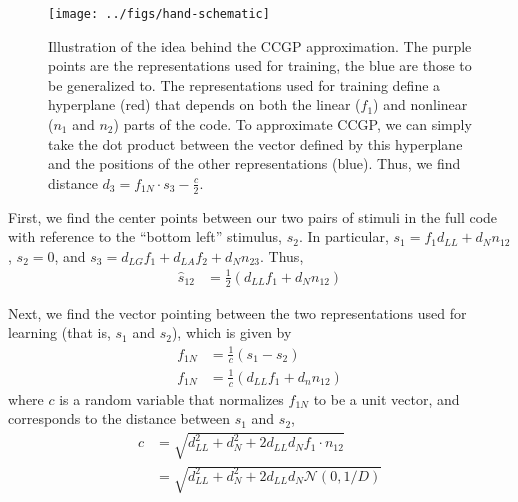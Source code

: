 \documentclass[letter,12pt]{article}
\newcommand{\dll}{d_{LL}}
\newcommand{\dlg}{d_{LG}}
\newcommand{\dla}{d_{LA}}
\newcommand{\dn}{d_{N}}
\newcommand{\dis}{\mathcal{N}(0, 1/D)}
\begin{document}
\begin{figure}[ht!]
  \begin{center}
    \texttt{[image: ../figs/hand-schematic]}
  \end{center}
  \caption[Illustration of the idea behind the CCGP approximation.]
          {Illustration of the idea behind the CCGP approximation.
            The purple points are the representations used for training, the
            blue are those to be generalized to. The representations used
            for training define a hyperplane (red) that depends on both the
            linear ($f_{1}$) and nonlinear ($n_{1}$ and $n_{2}$) parts of
            the code. To approximate CCGP, we can simply take the dot product
            between the vector defined by this hyperplane and the positions of
            the other representations (blue). Thus, we find distance
            $d_{3} = f_{1N} \cdot s_{3} - \frac{c}{2}$. 
  }
  \label{schem}
\end{figure}

First, we find the center points between our two pairs of stimuli in the full
code with reference to the ``bottom left'' stimulus, $s_{2}$. In particular,
$s_{1} = f_{1} \dll + \dn n_{12}$, $s_{2} = 0$, and
$s_{3} = \dlg f_{1} + \dla f_{2} + \dn n_{23}$. Thus, 
\begin{align}
  \hat{s}_{12} &= \frac{1}{2}\left(\dll f_{1} + \dn n_{12}\right)
\end{align}

Next, we find the vector pointing between the two representations used for
learning (that is, $s_{1}$ and $s_{2}$), which is given by
\begin{align}
  f_{1N} &= \frac{1}{c}\left(s_{1} - s_{2}\right) \\
  f_{1N} &= \frac{1}{c}\left(\dll f_{1} + d_{n}n_{12}\right)
\end{align}
where $c$ is a random variable that normalizes $f_{1N}$ to be a unit
vector, and corresponds to the distance between $s_{1}$ and $s_{2}$,
\begin{align}
  c &= \sqrt{\dll^{2} + \dn^{2} + 2 \dll \dn f_{1} \cdot n_{12}} \\
  &= \sqrt{\dll^{2} + \dn^{2} + 2 \dll \dn \dis} 
\end{align}
\end{document}
